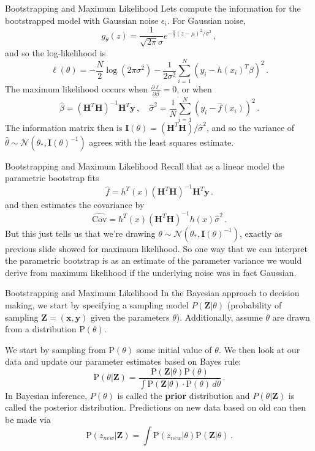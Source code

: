 \documentclass[10pt, table, dvipsnames,xcdraw, handout]{beamer}
\newcommand{\bfy}{\ensuremath{\mathbf{y}}}
\begin{document}
\begin{frame}[fragile]{Bootstrapping and Maximum Likelihood}
Lets compute the information for the bootstrapped model with Gaussian noise $\epsilon_i$. For Gaussian noise, 
$$
g_\theta(z) = \frac{1}{\sqrt{2\pi}\sigma}e^{-\frac12(z-\mu)^2/\sigma^2}\,,
$$\pause
and so the log-likelihood is 
$$
\ell(\theta) = -\frac{N}{2}\log(2\pi\sigma^2) - \frac{1}{2\sigma^2}\sum_{i=1}^N(y_i-h(x_i)^T\beta)^2\,.
$$\pause
The maximum likelihood occurs when $\frac{\partial \ell}{\partial \beta} = 0$, or when
$$
\hat{\beta} = (\mathbf{H}^T\mathbf{H})^{-1}\mathbf{H}^T\bfy\,,\hspace{1em}\hat{\sigma}^2 = \frac{1}{N}\sum_{i=1}^N(y_i - \hat{f}(x_i))^2\,.
$$\pause
The information matrix then is $\mathbf{I}(\theta) = (\mathbf{H}^T\mathbf{H})/\hat{\sigma}^2$, and so the variance of $\hat{\theta}\sim \mathcal{N}(\theta_*,\mathbf{I}(\theta)^{-1})$ agrees with the least squares estimate. 
\end{frame}


\begin{frame}[fragile]{Bootstrapping and Maximum Likelihood}
Recall that as a linear model the parametric bootstrap fits 
$$
\hat{f} = h^T(x)(\mathbf{H}^T\mathbf{H})^{-1}\mathbf{H}^T\bfy\,.
$$ \pause
and then estimates the covariance by 
$$ 
\hat{\text{Cov}} = h^T(x)(\mathbf{H}^T\mathbf{H})^{-1}h(x)\hat{\sigma}^2\,.
$$\pause
But this just tells us that we're drawing $\theta\sim \mathcal{N}(\theta_*,\mathbf{I}(\theta)^{-1})$, exactly as previous slide showed for maximum  likelihood. So one way that we can interpret the parametric bootstrap is as an estimate of the parameter variance we would derive from maximum likelihood if the underlying noise was in fact Gaussian.
\end{frame}


\begin{frame}[fragile]{Bootstrapping and Maximum Likelihood}
In the Bayesian approach to decision making, we start by specifying a sampling model $P(\mathbf{Z}|\theta)$ (probability of sampling $\mathbf{Z} = (\mathbf{x},\mathbf{y})$ given the parameters $\theta$). Additionally, assume $\theta$ are drawn from a distribution $\text{P}(\theta)$. 

\pause We start by sampling from $\text{P}(\theta)$ some initial value of $\theta$. We then look at our data and update our parameter estimates based on Bayes rule:
$$
\text{P}(\theta|\mathbf{Z}) = \frac{\text{P}(\mathbf{Z}|\theta) \text{P}(\theta)}{\int  \text{P}(\mathbf{Z}|\theta)\cdot \text{P}(\theta)\,d\theta}\,.
$$\pause
In Bayesian inference, $P(\theta)$ is called the \textbf{prior} distribution and $P(\theta|\mathbf{Z})$ is called the posterior distribution. Predictions on new data based on old can then be made via
$$
\text{P}(z_{new}|\mathbf{Z}) = \int \text{P}(z_{new}|\theta)\text{P}(\mathbf{Z}|\theta)\,.
$$
\end{frame}
\end{document}
